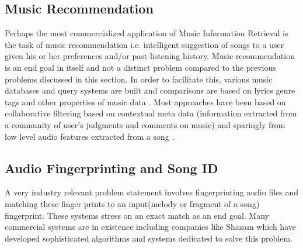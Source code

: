 \subsection{Music Recommendation}

\noindent Perhaps the most commercialized application of Music Information Retrieval is the task of music recommendation i.e. intelligent suggestion of songs to a user given his or her preferences and/or past listening history. Music recommendation is an end goal in itself and not a distinct problem compared to the previous problems discussed in this section. In order to facilitate this, various music databases \cite{humdrumkern, msd} and query systems are built and comparisons are based on lyrics genre tags and other properties of music data \cite{musicrecSurvey}. Most approaches have been based on collaborative filtering \cite{amazonreco} based on contextual meta data (information extracted from a community of user's judgments and comments on music) and sparingly from low level audio features extracted from a song \cite{musicrecSurvey}. 

\subsection{Audio Fingerprinting and Song ID}

\noindent A very industry relevant problem statement involves fingerprinting audio files and matching these finger prints to an input(melody or fragment of a song) fingerprint. These systems stress on an exact match as an end goal. Many commercial systems are in existence including companies like Shazam \cite{shazam} which have developed sophisticated algorithms and systems dedicated to solve this problem.



